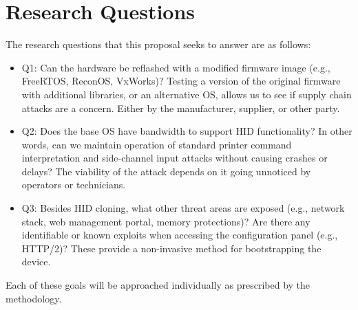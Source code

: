 


\section{Research Questions}  \label{researchquestions}

The research questions that this proposal seeks to answer are as follows:
\begin{itemize}
  \item Q1: Can the hardware be reflashed with a modified firmware image (e.g., FreeRTOS, ReconOS, VxWorks)? Testing a version of the original firmware with additional libraries, or an alternative OS, allows us to see if supply chain attacks are a concern. Either by the manufacturer, supplier, or other party.  
  \item Q2: Does the base OS have bandwidth to support HID functionality? In other words, can we maintain operation of standard printer command interpretation and side-channel input attacks without causing crashes or delays? The viability of the attack depends on it going unnoticed by operators or technicians. 
  \item Q3: Besides HID cloning, what other threat areas are exposed (e.g., network stack, web management portal, memory protections)? Are there any identifiable or known exploits when accessing the configuration panel (e.g., HTTP/2)? These provide a non-invasive method for bootstrapping the device.
\end{itemize}

Each of these goals will be approached individually as prescribed by the methodology.